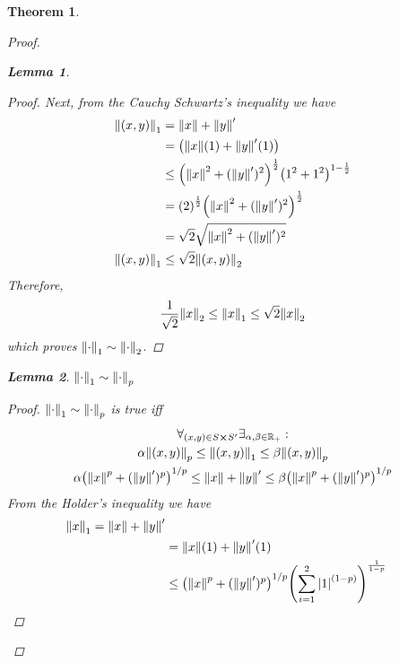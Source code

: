 \documentclass[]{article}
\newcommand{\R}{\mathbb{R}}
\newtheorem{theorem}{Theorem}
\newtheorem{lemma}{Lemma}
\begin{document}
\begin{theorem}
\begin{proof}
\begin{lemma}
\begin{proof}
                Next, from the Cauchy Schwartz's inequality we have 
                \begin{align*}
                    \norm{(x,y)}_1 
                        &= \norm{x} + \norm{y}'\\
                    &= \qty(\norm{x} (1) + \norm{y}' (1))\\
                    &\leq \qty(\norm{x}^2 + (\norm{y}')^2)^{\frac{1}{2}} \qty(1^2 + 1^2)^{1 - \frac{1}{2}}\\
                    &= \qty(2)^\frac{1}{2} \qty(\norm{x}^2 + (\norm{y}')^2)^{\frac{1}{2}}\\
                    &= \sqrt{2} \sqrt{\norm{x}^2 + (\norm{y}')^2}\\
                    \norm{(x,y)}_1
                        &\leq \sqrt{2} \norm{(x,y)}_2
                \end{align*}
                Therefore,
                \[\frac{1}{\sqrt{2}} \norm{x}_2 \leq \norm{x}_1 \leq \sqrt{2} \norm{x}_2\]
                which proves $\norm{\cdot}_1 \sim \norm{\cdot}_2$.
            \end{proof}
        \end{lemma}
        \newpage
        \begin{lemma}\label{lem:2-1toP}
            $\norm{\cdot}_1 \sim \norm{\cdot}_p$
            \begin{proof}
                $\norm{\cdot}_1 \sim \norm{\cdot}_p$ is true iff
                \begin{multline*}
                    \forall_{(x,y) \in S \cross S'} \exists_{\alpha,\beta \in \R_+} :\\
                    \alpha \norm{(x,y)}_p 
                        \leq \norm{(x,y)}_1 
                        \leq \beta \norm{(x,y)}_p\\
                    \alpha \qty(\norm{x}^p + (\norm{y}')^p)^{1/p}
                        \leq \norm{x} + \norm{y}'
                        \leq \beta \qty(\norm{x}^p + (\norm{y}')^p)^{1/p}\\
                \end{multline*}
                From the Holder's inequality we have 
                \begin{align*}
                    \norm{x}_1 = \norm{x} + \norm{y}'\\
                        &= \norm{x}(1) + \norm{y}'(1)\\
                        &\leq \qty(\norm{x}^p + (\norm{y}')^p)^{1/p} \qty(\sum_{i=1}^2 \abs{1}^{(1-p)})^{\frac{1}{1-p}}\\

\end{align*}
\end{proof}
\end{lemma}
\end{proof}
\end{theorem}
\end{document}
